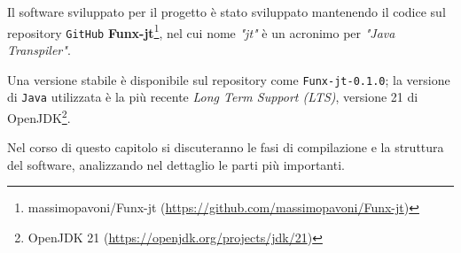 \chapter{}
\label{chap:5-compiler}

Il software sviluppato per il progetto è stato sviluppato mantenendo il codice sul repository \texttt{GitHub}
\textbf{Funx-jt}\footnote{massimopavoni/Funx-jt (\url{https://github.com/massimopavoni/Funx-jt})},
nel cui nome \textit{"jt"} è un acronimo per \textit{"Java Transpiler"}.

\noindent Una versione stabile è disponibile sul repository come \texttt{Funx-jt-0.1.0};
la versione di \texttt{Java} utilizzata è la più recente \textit{Long Term Support (LTS)},
versione 21 di OpenJDK\footnote{OpenJDK 21 (\url{https://openjdk.org/projects/jdk/21})}.

Nel corso di questo capitolo si discuteranno le fasi di compilazione e la struttura del software,
analizzando nel dettaglio le parti più importanti.

